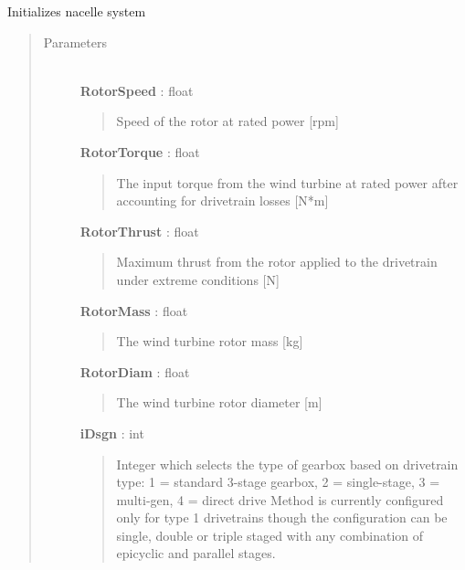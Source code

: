 \documentclass[letterpaper,10pt,openany,oneside]{sphinxmanual}
\begin{document}
\begin{fulllineitems}
\label{documentation:nacelleSE.src.nacelleSE.NacelleSystem}
Initializes nacelle system
\begin{quote}\begin{description}
\item[{Parameters }] \leavevmode\\
\textbf{RotorSpeed} : float
\begin{quote}

Speed of the rotor at rated power {[}rpm{]}
\end{quote}

\textbf{RotorTorque} : float
\begin{quote}

The input torque from the wind turbine at rated power after accounting for drivetrain losses {[}N*m{]}
\end{quote}

\textbf{RotorThrust} : float
\begin{quote}

Maximum thrust from the rotor applied to the drivetrain under extreme conditions {[}N{]}
\end{quote}

\textbf{RotorMass} : float
\begin{quote}

The wind turbine rotor mass {[}kg{]}
\end{quote}

\textbf{RotorDiam} : float
\begin{quote}

The wind turbine rotor diameter {[}m{]}
\end{quote}

\textbf{iDsgn} : int
\begin{quote}

Integer which selects the type of gearbox based on drivetrain type: 1 = standard 3-stage gearbox, 2 = single-stage, 3 = multi-gen, 4 = direct drive
Method is currently configured only for type 1 drivetrains though the configuration can be single, double or triple staged with any combination of epicyclic and parallel stages.
\end{quote}


\end{description}
\end{quote}
\end{fulllineitems}
\end{document}

